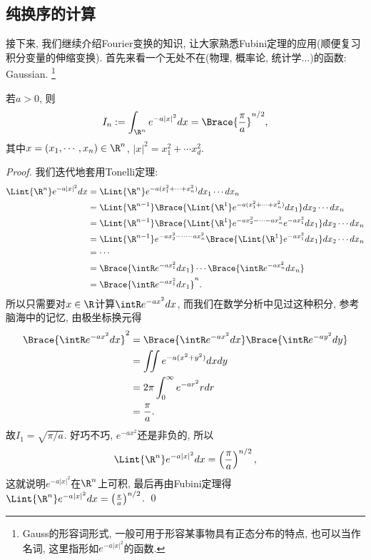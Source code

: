 \subsection{纯换序的计算}
接下来, 我们继续介绍Fourier变换的知识, 让大家熟悉Fubini定理的应用(顺便复习积分变量的伸缩变换). 首先来看一个无处不在(物理, 概率论, 统计学...)的函数: Gaussian.
\footnote{Gauss的形容词形式, 一般可用于形容某事物具有正态分布的特点, 也可以当作名词, 这里指形如$e^{-a|x|^2}$的函数.}
\begin{example}[~(Gaussian)]
    若$a>0$, 则
    $$I_n := \int_{\R^n}e^{-a|x|^2}dx = \Brace{\frac{\pi}{a}}^{n/2},$$
    其中$x=(x_1, \cdots, x_n) \in \R^n$, $|x|^2 = x_1^2 + \cdots x_d^2$.
\end{example}
\begin{proof}
    我们迭代地套用Tonelli定理:
    \begin{align*}
    \Lint{\R^n}e^{-a|x|^2}dx 
    &= \Lint{\R^n}e^{-a(x_1^2+\cdots+x_n^2)} dx_1 \cdots dx_n \\
    &= \Lint{\R^{n-1}}\Brace{\Lint{\R^1}e^{-a(x_1^2+\cdots+x_n^2)}dx_1 }dx_2 \cdots dx_n \\
    &= \Lint{\R^{n-1}}\Brace{\Lint{\R^1}e^{-ax_2^2-\cdots-ax_n^2}e^{-ax_1^2}dx_1} 
       dx_2 \cdots dx_n \\
    &= \Lint{\R^{n-1}}e^{-ax_2^2-\cdots-ax_n^2} \Brace{\Lint{\R^1}e^{-ax_1^2}dx_1} 
       dx_2 \cdots dx_n \\
    &= \cdots \\
    &= \Brace{\intR e^{-ax_1^2}dx_1} \cdots \Brace{\intR e^{-ax_n^2}dx_n} \\
    &= \Brace{\intR e^{-ax_1^2}dx_1}^n.
    \end{align*}
    所以只需要对$x \in \R$计算$\intR e^{-ax^2}dx$, 而我们在数学分析中见过这种积分, 参考脑海中的记忆, 由极坐标换元得
    \begin{align*}
    \Brace{\intR e^{-ax^2}dx}^2
    &= \Brace{\intR e^{-ax^2}dx}\Brace{\intR e^{-ay^2}dy} \\
    &= \iint e^{-a(x^2+y^2)} dxdy \\
    &= 2\pi \int_0^\infty e^{-ar^2}r dr \\
    &= \frac{\pi}{a}. 
    \end{align*}
    故$I_1=\sqrt{\pi/a}$. 好巧不巧, $e^{-ax^2}$还是非负的, 所以
    $$\Lint{\R^n}e^{-a|x|^2}dx = \left(\frac{\pi}{a}\right)^{n/2},$$
    这就说明$e^{-a|x|^2}$在$\R^n$上可积, 最后再由Fubini定理得$\Lint{\R^n}e^{-a|x|^2}dx = \left(\frac{\pi}{a}\right)^{n/2}$.
    \qed 
\end{proof}

